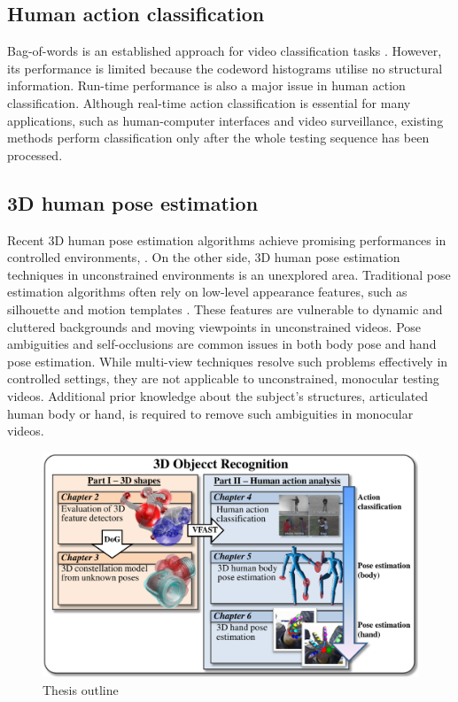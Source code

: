 \subsection{Human action classification}


Bag-of-words is an established approach for video classification tasks \cite{Schuldt2004, Dollar2005, Riemenschneider2009, Niebles2008, Wong2007}. However, its performance is limited because the codeword histograms utilise no structural information. Run-time performance is also a major issue in human action classification. Although real-time action classification is essential for many applications, such as human-computer interfaces and video surveillance, existing methods perform classification only after the whole testing sequence has been processed. 

\subsection{3D human pose estimation} 


Recent 3D human pose estimation algorithms achieve promising performances in controlled environments, \eg \cite{Rogez2012, Pons-Moll2011, Sigal2012}. On the other side, 3D human pose estimation techniques in unconstrained environments is an unexplored area.       
Traditional pose estimation algorithms often rely on low-level appearance features, such as silhouette and motion templates \cite{Bissacco2007, Rogez2012, Ionescu2011, Navaratnam2006}. These features are vulnerable to dynamic and cluttered backgrounds and moving viewpoints in unconstrained videos. 
Pose ambiguities and self-occlusions are common issues in both body pose and hand pose estimation. While multi-view techniques resolve such problems effectively in controlled settings, they are not applicable to unconstrained, monocular testing videos. Additional prior knowledge about the subject's structures, \eg articulated human body or hand, is required to remove such ambiguities in monocular videos. 

\begin{figure}[ht]
\centering
\includegraphics[width=1\linewidth]{./fig/intro/intro.pdf}
\caption{Thesis outline} 
\label{fig/intro/outline}
\end{figure}

